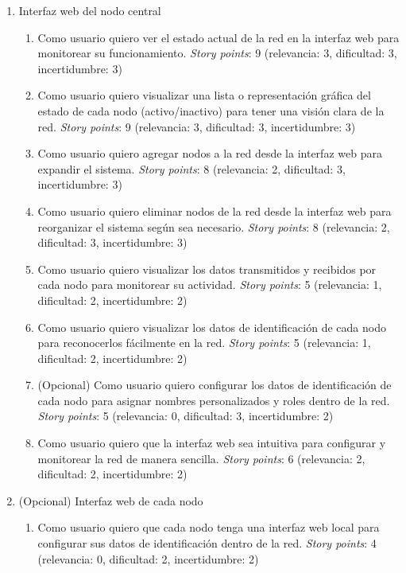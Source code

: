 \documentclass[
11pt, %
]{charter}
\begin{document}
\begin{enumerate}
\item Interfaz web del nodo central
\begin{enumerate}
	\item Como usuario quiero ver el estado actual de la red en la interfaz web para monitorear su funcionamiento. \textit{Story points}: 9 (relevancia: 3, dificultad: 3, incertidumbre: 3)

	\item Como usuario quiero visualizar una lista o representación gráfica del estado de cada nodo (activo/inactivo) para tener una visión clara de la red. \textit{Story points}: 9 (relevancia: 3, dificultad: 3, incertidumbre: 3)

	\item Como usuario quiero agregar nodos a la red desde la interfaz web para expandir el sistema. \textit{Story points}: 8 (relevancia: 2, dificultad: 3, incertidumbre: 3)

	\item Como usuario quiero eliminar nodos de la red desde la interfaz web para reorganizar el sistema según sea necesario. \textit{Story points}: 8 (relevancia: 2, dificultad: 3, incertidumbre: 3)

	\item Como usuario quiero visualizar los datos transmitidos y recibidos por cada nodo para monitorear su actividad. \textit{Story points}: 5 (relevancia: 1, dificultad: 2, incertidumbre: 2)

	\item Como usuario quiero visualizar los datos de identificación de cada nodo para reconocerlos fácilmente en la red. \textit{Story points}: 5 (relevancia: 1, dificultad: 2, incertidumbre: 2)

	\item (Opcional) Como usuario quiero configurar los datos de identificación de cada nodo para asignar nombres personalizados y roles dentro de la red. \textit{Story points}: 5 (relevancia: 0, dificultad: 3, incertidumbre: 2)

	\item Como usuario quiero que la interfaz web sea intuitiva para configurar y monitorear la red de manera sencilla. \textit{Story points}: 6 (relevancia: 2, dificultad: 2, incertidumbre: 2)

\end{enumerate}

\item (Opcional) Interfaz web de cada nodo
\begin{enumerate}
	\item Como usuario quiero que cada nodo tenga una interfaz web local para configurar sus datos de identificación dentro de la red. \textit{Story points}: 4 (relevancia: 0, dificultad: 2, incertidumbre: 2)


\end{enumerate}
\end{enumerate}
\end{document}
